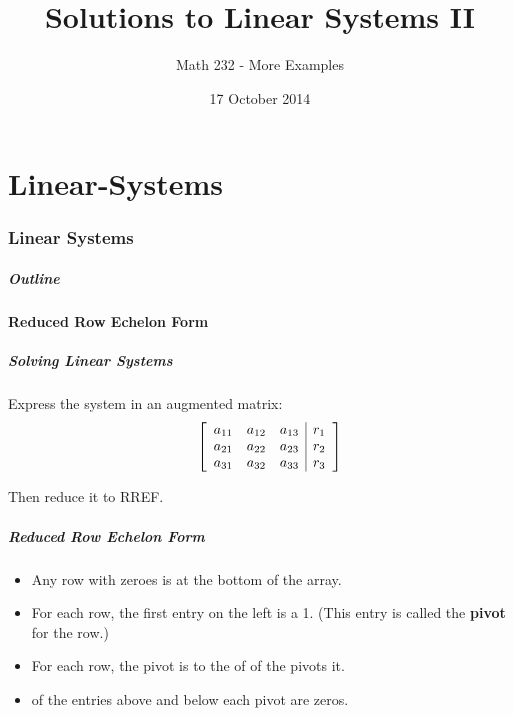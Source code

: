 \part{Linear-Systems}
\section{Linear Systems}

\title{Solutions to Linear Systems II}
\subtitle{Math 232 - More Examples}
\date{17 October 2014}

\begin{frame}
  \titlepage
\end{frame}

\begin{frame}
  \frametitle{Outline}
  \tableofcontents[ currentsection ]
\end{frame}


\subsection{Reduced Row Echelon Form}


\begin{frame}
  \frametitle{Solving Linear Systems}

  Express the system in an augmented matrix:
  \begin{eqnarray*}
    \stateThree{~}{~}{~}
    \startRowOps
    \oneRowOps{a_{11}}{a_{12}}{a_{13}}{r_1}
    \oneRowOps{a_{21}}{a_{22}}{a_{23}}{r_2}
    \oneRowOps{a_{31}}{a_{32}}{a_{33}}{r_3}
    \stopRowOps
  \end{eqnarray*}

  Then reduce it to RREF.

\end{frame}



\begin{frame}
  \frametitle{Reduced Row Echelon Form}

  \begin{itemize}
  \item Any row with  zeroes is at the bottom of the array.
  \item For each row, the first  entry on the left
    is a 1. (This entry is called the \textbf{pivot} for the row.)
  \item For each row, the pivot is to the  of
     of the pivots  it.
  \item {} of the entries above and below each pivot are
    zeros.
  \end{itemize}

\end{frame}


